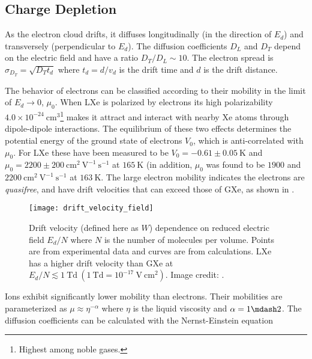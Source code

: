 \subsection{Charge Depletion}
\label{subsubsec:importance_procedure_effects_charge}
As the electron cloud drifts, it diffuses
longitudinally (in the direction of $E_{d}$) and transversely (perpendicular to $E_{d}$).  The
diffusion coefficients $D_{L}$ and $D_{T}$ depend on the electric field and have a ratio $D_{T}/D_{L} \sim 10$.  The electron spread is
$\sigma_{D_{T}} = \sqrt{D_{T} t_{d}}$ where $t_{d} = d/v_{d}$ is the drift time and $d$ is the drift distance.

The behavior of electrons can be classified according to their mobility in the limit of $E_d\! \rightarrow \! 0$, $\mu_0$.  When LXe is
polarized by electrons its high polarizability $4.0 \times 10^{-24}\ \mathrm{cm^3}$\footnote{Highest among noble gases.} makes it
attract \electron and interact with nearby Xe atoms through dipole-dipole interactions.  The equilibrium of these two effects
determines the potential energy of the ground state of electrons $V_0$, which is anti-correlated with $\mu_0$.  For LXe these have
been measured to be $V_0 = -0.61 \pm 0.05\ \mathrm{K}$  and $\mu_0 = 2200 \pm 200\ \mathrm{cm^2\ V^{-1}\ s^{-1}}$
 at $165\ \mathrm{K}$ (in addition, $\mu_0$ was found to be $1900$  and
$2200\ \mathrm{cm^2\ V^{-1}\ s^{-1}}$ 
at $163\ \mathrm{K}$.  The large electron mobility indicates the
electrons are \textit{quasifree}, and have drift velocities that can exceed those of GXe, as shown in
.

\begin{figure}
\centering
\texttt{[image: drift\_velocity\_field]}
\caption[Drift velocity dependence on reduced electric field $E_d/N$ where $N$ is the number of molecules per
volume.]{Drift velocity (defined here as $W$) dependence on reduced electric field $E_d/N$ where $N$ is the number of molecules per
volume.  Points are from experimental data  and curves are from
calculations.  LXe has a higher drift velocity than GXe at
$E_d/N \lesssim 1\ \mathrm{Td}\ (1\ \mathrm{Td} = 10^{-17}\ \mathrm{V\ cm^2})$.  Image credit: .}
\label{fig:importance_procedure_effects_charge_drift_velocity}
\end{figure}

Ions exhibit significantly lower mobility than electrons.  Their mobilities are parameterized as $\mu \approx \eta^{-\alpha}$ where
$\eta$ is the liquid viscosity and $\alpha = 1 \mdash 2$.  The diffusion coefficients can be calculated with the Nernst-Einstein equation

